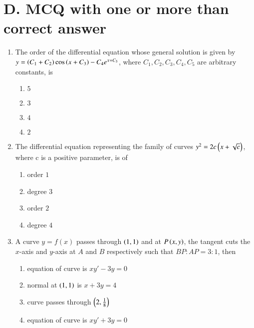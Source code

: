 \documentclass[journal,12pt,twocolumn]{IEEEtran}
\theoremstyle{remark}
\begin{document}
\section*{D. MCQ with one or more than correct answer}
\begin{enumerate}
    
\item The order of the differential equation whose general solution is given by
$y = \left(C_1 + C_2\right) \cos \left(x + C_3\right) - C_4 e^{x+C_5}$, where $C_1, C_2, C_3, C_4, C_5$ are arbitrary constants, is \hfill {}

\begin{multicols}{2}
\begin{enumerate}
    \item $5$
    \item $3$ 
    \item $4$
    \item $2$ 
\end{enumerate} 
\end{multicols}

\item  The differential equation representing the family of curves
$y^2 = 2c \left(x + \sqrt{c}\right)$, where c  is a positive parameter, is of \hfill {}

\begin{multicols}{2}
\begin{enumerate}
    \item order $1$ 
    \item degree $3$
    \item order $2$
    \item degree $4$
\end{enumerate}
\end{multicols}

\item  A curve $ y = f(x) $ passes through $ \left(1,1\right) $ and at $ P\left(x, y\right) $, the tangent cuts the $ x $-axis and $ y $-axis at $ A $ and $ B $ respectively such that $ BP : AP = 3 : 1 $, then \hfill {}
\begin{enumerate}
    \item equation of curve is $ xy' - 3y = 0 $
    \item normal at $ \left(1, 1\right) $ is $ x + 3y = 4 $
    \item curve passes through $ \left(2, \frac{1}{8}\right) $
    \item equation of curve is $xy' + 3y = 0 $
\end{enumerate}


\end{enumerate}
\end{document}
